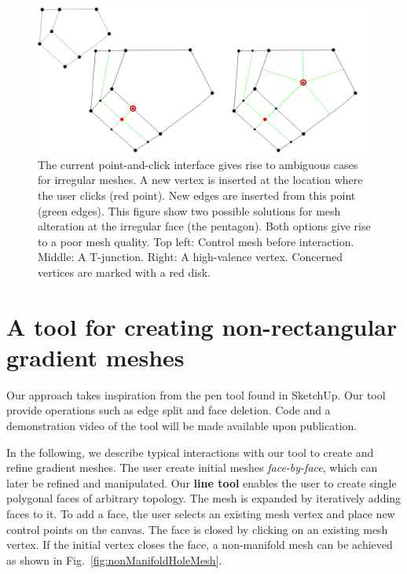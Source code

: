\documentclass{egpubl}
\begin{document}
	
	\begin{figure}[t]
		\centering
		\includegraphics[scale=0.3]{pentagonWControlMesh.png}
		\caption{The current point-and-click interface gives rise to ambiguous cases for irregular meshes. A new vertex is inserted at the location where the user clicks (red point). New edges are inserted from this point (green edges). This figure show two possible solutions for mesh alteration at the irregular face (the pentagon). Both options give rise to a poor mesh quality. Top left: Control mesh before interaction. Middle: A T-junction. Right: A high-valence vertex. Concerned vertices are marked with a red disk.
		}
		\label{fig:adHocPentagon}
	\end{figure}
	
	\section{A tool for creating non-rectangular gradient meshes}
	\label{sec:method}
	
	Our approach takes inspiration from the pen tool found in SketchUp. Our tool provide operations such as edge split and face deletion. Code and a demonstration video of the tool will be made available upon publication.
	
	In the following, we describe typical interactions with our tool to create and refine gradient meshes. The user create initial meshes \textit{face-by-face}, which can later be refined and manipulated. Our \textbf{line tool} enables the user to create single polygonal faces of arbitrary topology. The mesh is expanded by iteratively adding faces to it. To add a face, the user selects an existing mesh vertex and place new control points on the canvas. The face is closed by clicking on an existing mesh vertex. If the initial vertex closes the face, a non-manifold mesh can be achieved as shown in Fig.~\ref{fig:nonManifoldHoleMesh}.
	
\end{document}
